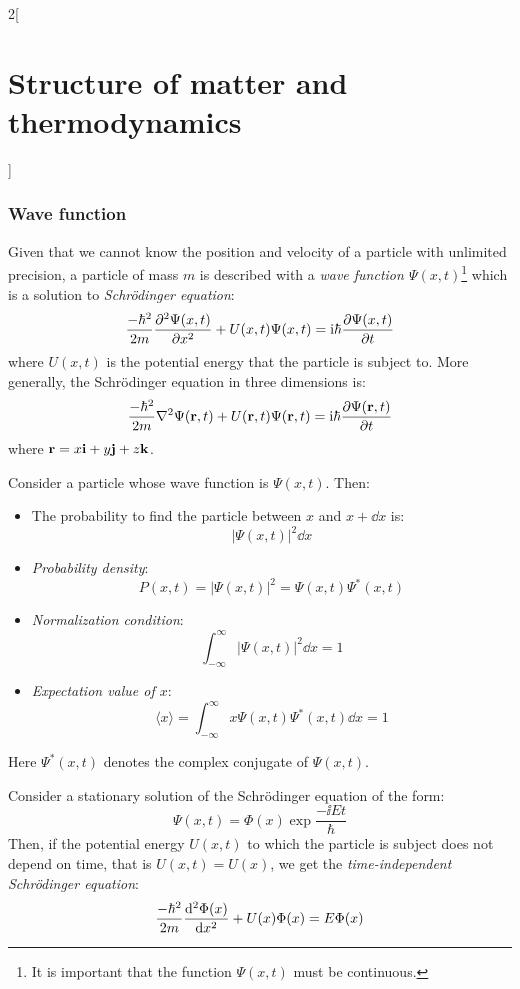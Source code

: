 \documentclass[../../../main.tex]{subfiles}
\begin{document}
\begin{multicols}{2}[\section{Structure of matter and thermodynamics}]
  \subsubsection{Wave function}
  \begin{definition}
    Given that we cannot know the position and velocity of a particle with unlimited precision, a particle of mass $m$ is described with a \textit{wave function $\Psi(x,t)$}\footnote{It is important that the function $\Psi(x,t)$ must be continuous.} which is a solution to \textit{Schrödinger equation}:
    $$\frac{-\hbar^2}{2m}\pdv[2]{\Psi(x,t)}{x}+U(x,t)\Psi(x,t)=\mathrm{i}\hbar\pdv{\Psi(x,t)}{t}$$
    where $U(x,t)$ is the potential energy that the particle is subject to. More generally, the Schrödinger equation in three dimensions is:
    $$\frac{-\hbar^2}{2m}\laplacian\Psi(\vectorfunction{r},t)+U(\vectorfunction{r},t)\Psi(\vectorfunction{r},t)=\ii\hbar\pdv{\Psi(\vectorfunction{r},t)}{t}$$ where $\boldsymbol{\mathrm{r}}=x\boldsymbol{\mathrm{i}}+y\boldsymbol{\mathrm{j}}+z\boldsymbol{\mathrm{k}}$.
  \end{definition}
  \begin{prop}
    Consider a particle whose wave function is $\Psi(x,t)$. Then:
    \begin{itemize}
      \item The probability to find the particle between $x$ and $x+\dd x$ is: $$|\Psi(x,t)|^2\dd x$$
      \item \textit{Probability density}: $$P(x,t)=|\Psi(x,t)|^2=\Psi(x,t)\Psi^*(x,t)$$
      \item \textit{Normalization condition}: $$\int_{-\infty}^\infty|\Psi(x,t)|^2\dd x=1$$
      \item \textit{Expectation value of $x$}: $$\langle x\rangle=\int_{-\infty}^\infty x\Psi(x,t)\Psi^*(x,t)\dd x=1$$
    \end{itemize}
    Here $\Psi^*(x,t)$ denotes the complex conjugate of $\Psi(x,t)$.
  \end{prop}
  \begin{definition}
    Consider a stationary solution of the Schrö\-din\-ger equation of the form: $$\Psi(x,t)=\Phi(x)\exp{\frac{-\ii Et}{\hbar}}$$
    Then, if the potential energy $U(x,t)$ to which the particle is subject does not depend on time, that is $U(x,t)=U(x)$, we get the \textit{time-independent Schrödinger equation}:
    \begin{equation}\label{SMT-TI_schrodinger}
      \frac{-\hbar^2}{2m}\dv[2]{\Phi(x)}{x}+U(x)\Phi(x)=E\Phi(x)

\end{equation}
\end{definition}
\end{multicols}
\end{document}
